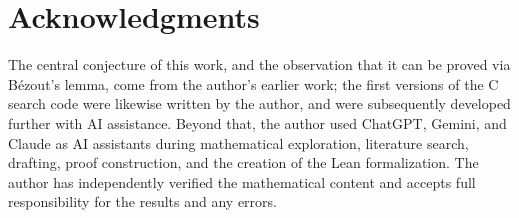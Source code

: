 \documentclass[11pt,reqno]{amsart}
\theoremstyle{plain}
\theoremstyle{definition}
\theoremstyle{remark}
\begin{document}
\section*{Acknowledgments}

The central conjecture of this work, and the observation that it can be proved via
B\'ezout's lemma, come from the author's earlier work; the first versions of the C
search code were likewise written by the author, and were subsequently developed
further with AI assistance.
Beyond that, the author used ChatGPT, Gemini, and Claude as AI assistants during
mathematical exploration, literature search, drafting, proof construction, and the
creation of the Lean formalization.
The author has independently verified the mathematical content and accepts full
responsibility for the results and any errors.
\end{document}
